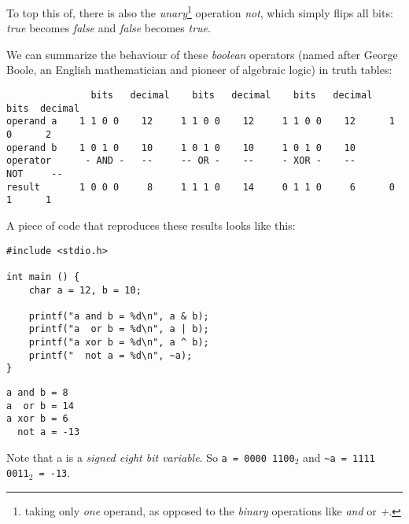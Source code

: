 {To top this of, there is also the \emph{unary}\footnote{\ie taking only \emph{one} operand, as opposed to the \emph{binary} operations like \emph{and} or \emph{+}.} operation \emph{not}, which simply flips all bits: \emph{true} becomes \emph{false} and \emph{false} becomes \emph{true}.

We can summarize the behaviour of these \emph{boolean} operators (named after George Boole, an English mathematician and pioneer of algebraic logic) in truth tables:
\begin{defbox}
\begin{verbatim}
               bits   decimal    bits   decimal    bits   decimal   bits  decimal
operand a    1 1 0 0    12     1 1 0 0    12     1 1 0 0    12      1 0      2
operand b    1 0 1 0    10     1 0 1 0    10     1 0 1 0    10
operator      - AND -   --     -- OR -    --     - XOR -    --      NOT     --
result       1 0 0 0     8     1 1 1 0    14     0 1 1 0     6      0 1      1
\end{verbatim}
 \label{tab:booleanLogic}
\end{defbox}

A piece of code that reproduces these results looks like this:
\begin{tcbraster}[raster columns=2,
                  raster equal height,
                  nobeforeafter,
                  raster column skip=0.2cm]
\begin{codebox}[bitwiseOps.c]
\begin{verbatim}
#include <stdio.h>

int main () {
    char a = 12, b = 10;
    
    printf("a and b = %d\n", a & b);
    printf("a  or b = %d\n", a | b);
    printf("a xor b = %d\n", a ^ b);
    printf("  not a = %d\n", ~a);
}
\end{verbatim}
\end{codebox}
%
\begin{cmdbox}
\begin{verbatim}
a and b = 8
a  or b = 14
a xor b = 6
  not a = -13
\end{verbatim}
\end{cmdbox}
\end{tcbraster}
Note that a  is a \emph{signed eight bit variable}. So \texttt{a = 0000 1100$_2$} and \texttt{\textasciitilde a = 1111 0011$_2$ = -13}.

}
